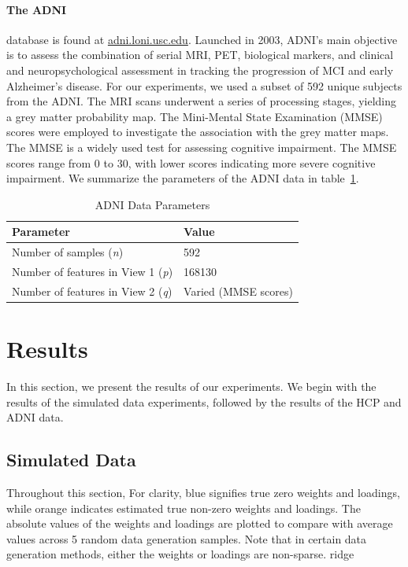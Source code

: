 \paragraph{The ADNI} database is found at \url{adni.loni.usc.edu}.
Launched in 2003, ADNI's main objective is to assess the combination of serial MRI, PET, biological markers, and clinical and neuropsychological assessment in tracking the progression of MCI and early Alzheimer’s disease.
For our experiments, we used a subset of 592 unique subjects from the ADNI. The MRI scans underwent a series of processing stages, yielding a grey matter probability map.
The Mini-Mental State Examination (MMSE) scores were employed to investigate the association with the grey matter maps.
The MMSE is a widely used test for assessing cognitive impairment.
The MMSE scores range from 0 to 30, with lower scores indicating more severe cognitive impairment.
We summarize the parameters of the ADNI data in table~\ref{table:adni-parameters}.

\begin{table}
\centering
\caption{ADNI Data Parameters}
\begin{tabular}{| l | l |}
\hline
\textbf{Parameter} & \textbf{Value} \\
\hline
Number of samples (\textit{n}) & 592 \\
Number of features in View 1 (\textit{p}) & 168130 \\
Number of features in View 2 (\textit{q}) & Varied (MMSE scores) \\
\hline
\end{tabular}\label{table:adni-parameters}
\end{table}

\section{Results}

In this section, we present the results of our experiments.
We begin with the results of the simulated data experiments, followed by the results of the HCP and ADNI data.

\subsection{Simulated Data}

Throughout this section, For clarity, blue signifies true zero weights and loadings, while orange indicates estimated true non-zero weights and loadings.
The absolute values of the weights and loadings are plotted to compare with average values across 5 random data generation samples.
Note that in certain data generation methods, either the weights or loadings are non-sparse.
ridge
